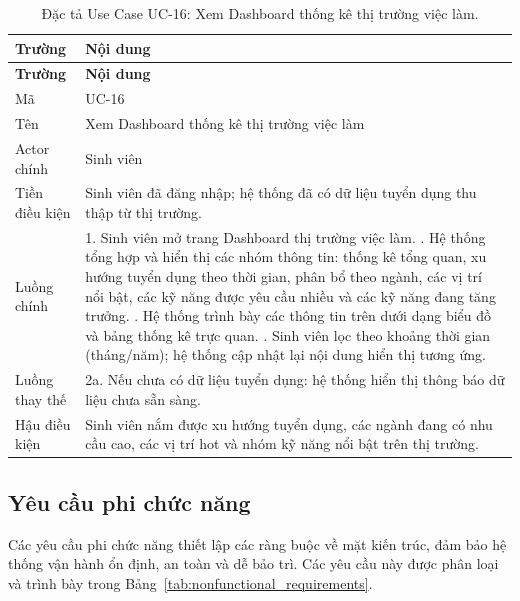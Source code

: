 \begin{longtable}{|L{3.5cm}|L{10cm}|}
\caption{Đặc tả Use Case UC-16: Xem Dashboard thống kê thị trường việc làm.}
\label{tab:uc16} \\
\hline
\textbf{Trường} & \textbf{Nội dung} \\
\hline
\endfirsthead
\hline
\textbf{Trường} & \textbf{Nội dung} \\
\hline
\endhead
Mã & UC-16 \\
\hline
Tên & Xem Dashboard thống kê thị trường việc làm \\
\hline
Actor chính & Sinh viên \\
\hline
Tiền điều kiện & Sinh viên đã đăng nhập; hệ thống đã có dữ liệu tuyển dụng thu thập từ thị trường. \\
\hline
Luồng chính & 1. Sinh viên mở trang Dashboard thị trường việc làm. . Hệ thống tổng hợp và hiển thị các nhóm thông tin: thống kê tổng quan, xu hướng tuyển dụng theo thời gian, phân bổ theo ngành, các vị trí nổi bật, các kỹ năng được yêu cầu nhiều và các kỹ năng đang tăng trưởng. . Hệ thống trình bày các thông tin trên dưới dạng biểu đồ và bảng thống kê trực quan. . Sinh viên lọc theo khoảng thời gian (tháng/năm); hệ thống cập nhật lại nội dung hiển thị tương ứng. \\
\hline
Luồng thay thế & 2a. Nếu chưa có dữ liệu tuyển dụng: hệ thống hiển thị thông báo dữ liệu chưa sẵn sàng. \\
\hline
Hậu điều kiện & Sinh viên nắm được xu hướng tuyển dụng, các ngành đang có nhu cầu cao, các vị trí hot và nhóm kỹ năng nổi bật trên thị trường. \\
\hline
\end{longtable}

\subsection{Yêu cầu phi chức năng}

Các yêu cầu phi chức năng thiết lập các ràng buộc về mặt kiến trúc, đảm bảo hệ thống vận hành ổn định, an toàn và dễ bảo trì. Các yêu cầu này được phân loại và trình bày trong Bảng~\ref{tab:nonfunctional_requirements}.

